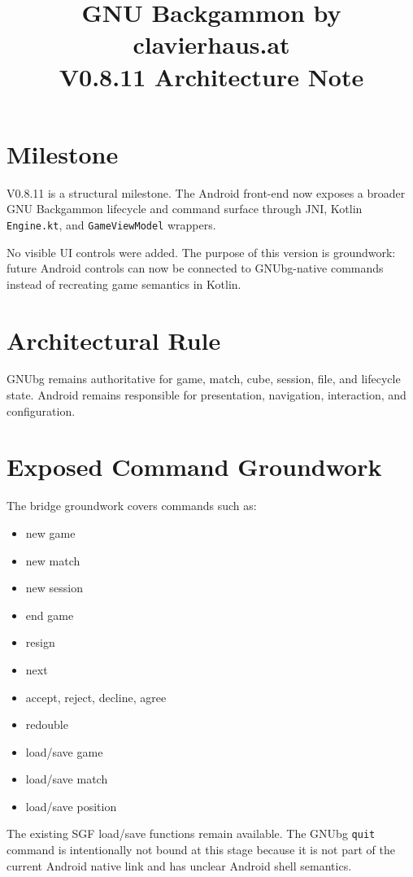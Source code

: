 \documentclass[11pt,a4paper]{article}
\title{GNU Backgammon by clavierhaus.at\\V0.8.11 Architecture Note}
\date{}
\begin{document}
\maketitle

\section*{Milestone}

V0.8.11 is a structural milestone.  The Android front-end now exposes a broader GNU Backgammon lifecycle and command surface through JNI, Kotlin \texttt{Engine.kt}, and \texttt{GameViewModel} wrappers.

No visible UI controls were added.  The purpose of this version is groundwork: future Android controls can now be connected to GNUbg-native commands instead of recreating game semantics in Kotlin.

\section*{Architectural Rule}

GNUbg remains authoritative for game, match, cube, session, file, and lifecycle state.  Android remains responsible for presentation, navigation, interaction, and configuration.

\section*{Exposed Command Groundwork}

The bridge groundwork covers commands such as:

\begin{itemize}[noitemsep]
  \item new game
  \item new match
  \item new session
  \item end game
  \item resign
  \item next
  \item accept, reject, decline, agree
  \item redouble
  \item load/save game
  \item load/save match
  \item load/save position
\end{itemize}

The existing SGF load/save functions remain available.  The GNUbg \texttt{quit} command is intentionally not bound at this stage because it is not part of the current Android native link and has unclear Android shell semantics.
\end{document}
